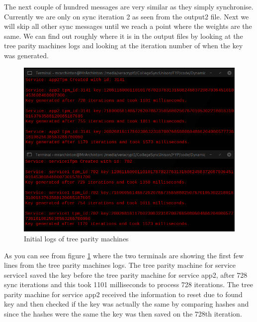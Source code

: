 The next couple of hundred messages are very similar as they simply synchronise. Currently we are only on sync iteration 2 as seen from the output2 file. Next we will skip all other sync messages until we reach a point where the weights are the same. We can find out roughly where it is in the output files by looking at the tree parity machines logs and looking at the iteration number of when the key was generated.
\begin{figure}[!h]
	\centering
	\includegraphics[width=1\textwidth]{Figures/sync11.png}
	\caption[Initial logs of tree parity machines]{Initial logs of tree parity machines}
	\label{fig:sync11}
\end{figure}
\FloatBarrier
As you can see from figure \ref{fig:sync11} where the two terminals are showing the first few lines from the tree parity machines logs. The tree parity machine for service service1 saved the key before the tree parity machine for service app2, after 728 sync iterations and this took 1101 milliseconds to process 728 iterations. The tree parity machine for service app2 received the information to reset due to found key and then checked if the key was actually the same by comparing hashes and since the hashes were the same the key was then saved on the 728th iteration. 

